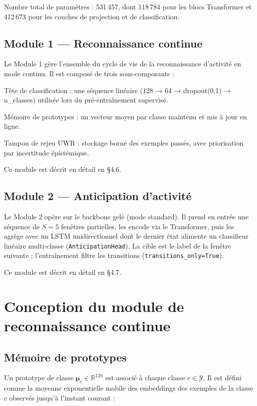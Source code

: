 Nombre total de paramètres : 531\,457, dont 118\,784 pour les blocs Transformer et 412\,673 pour les couches de projection et de classification.

\subsection{Module 1 — Reconnaissance continue}

Le Module 1 gère l'ensemble du cycle de vie de la reconnaissance d'activité en mode continu. Il est composé de trois sous-composants :

Tête de classification : une séquence linéaire (128 → 64 → dropout(0,1) → n\_classes) utilisée lors du pré-entraînement supervisé.

Mémoire de prototypes : un vecteur moyen par classe maintenu et mis à jour en ligne.

Tampon de rejeu UWR : stockage borné des exemples passés, avec priorisation par incertitude épistémique.

Ce module est décrit en détail en §4.6.

\subsection{Module 2 — Anticipation d'activité}

Le Module 2 opère sur le backbone gelé (mode standard). Il prend en entrée une
séquence de $S=5$ fenêtres partielles, les encode via le Transformer, puis les
agrège avec un LSTM unidirectionnel dont le dernier état alimente un
classifieur linéaire multi-classe (\texttt{AnticipationHead}). La cible est le
label de la fenêtre suivante ; l'entraînement filtre les transitions
(\texttt{transitions\_only=True}).

Ce module est décrit en détail en §4.7.

\section{Conception du module de reconnaissance continue}

\subsection{Mémoire de prototypes}

Un prototype de classe $\boldsymbol{\mu}_c \in \mathbb{R}^{128}$ est associé à chaque classe $c \in \mathcal{Y}$. Il est défini comme la moyenne exponentielle mobile des embeddings des exemples de la classe $c$ observés jusqu'à l'instant courant :

